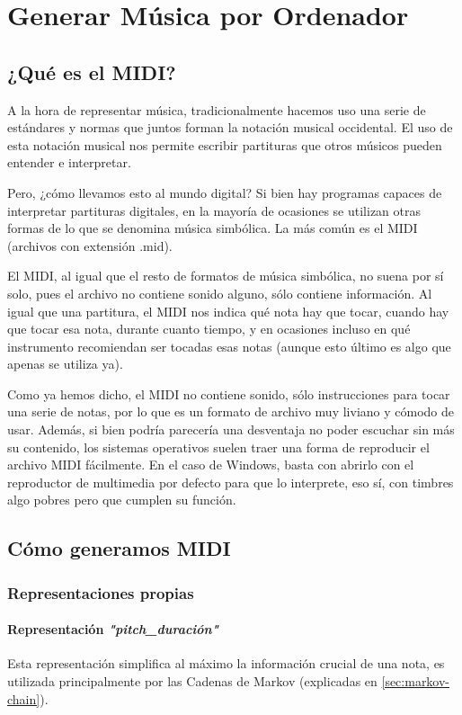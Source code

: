 \chapter{Generar Música por Ordenador}
\label{cap:generacionMusical}

\section{¿Qué es el MIDI?}
\label{subsec:que-es-midi}
A la hora de representar música, tradicionalmente hacemos uso una serie de estándares y normas que juntos forman la notación musical occidental. El uso de esta notación musical nos permite escribir partituras que otros músicos pueden entender e interpretar.

Pero, ¿cómo llevamos esto al mundo digital? Si bien hay programas capaces de interpretar partituras digitales, en la mayoría de ocasiones se utilizan otras formas de lo que se denomina música simbólica. La más común es el MIDI (archivos con extensión .mid).

El MIDI, al igual que el resto de formatos de música simbólica, no suena por sí solo, pues el archivo no contiene sonido alguno, sólo contiene información. Al igual que una partitura, el MIDI nos indica qué nota hay que tocar, cuando hay que tocar esa nota, durante cuanto tiempo, y en ocasiones incluso en qué instrumento recomiendan ser tocadas esas notas (aunque esto último es algo que apenas se utiliza ya).

Como ya hemos dicho, el MIDI no contiene sonido, sólo instrucciones para tocar una serie de notas, por lo que es un formato de archivo muy liviano y cómodo de usar. Además, si bien podría parecería una desventaja no poder escuchar sin más su contenido, los sistemas operativos suelen traer una forma de reproducir el archivo MIDI fácilmente. En el caso de Windows, basta con abrirlo con el reproductor de multimedia por defecto para que lo interprete, eso sí, con timbres algo pobres pero que cumplen su función.


\section{Cómo generamos MIDI}
    \subsection{Representaciones propias}
        \subsubsection{Representación \textit{"pitch\_duración"}}
        \label{subsub:representacion-pitch_duracion}
        Esta representación simplifica al máximo la información crucial de una nota, es utilizada principalmente por las Cadenas de Markov (explicadas en \ref{sec:markov-chain}).

